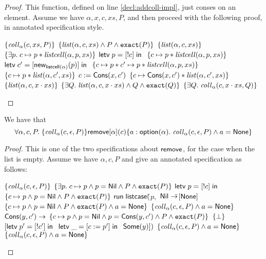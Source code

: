 \begin{proof}
  This function, defined on line \ref{decl:addcoll-impl}, just conses on an element. 
Assume we have $\alpha, x, c, xs, P$, and then proceed with the following proof, in
annotated specification style. 

\begin{specification}
\nextline $\{{\mathit{coll}_\alpha(c, xs, P)}\}$ 
\nextline $\{{\mathit{list}(\alpha, c, xs) \land P \land \mathtt{exact}({P})}\}$ 
\nextline $\{{\mathit{list}(\alpha, c, xs)}\}$ 
\nextline $\{{\exists p.\; c \mapsto p * \mathit{listcell}(\alpha, p, xs)}\}$ 
\nextline $\mathsf{letv}\;p = [!c]\;\mathsf{in}\;$ 
\nextline $\{{c \mapsto p * \mathit{listcell}(\alpha, p, xs)}\}$ 
\nextline $\mathsf{letv}\;c' = [\mathsf{new}_{\mathsf{listcell}(\alpha)}(p)]\;\mathsf{in}\;$
\nextline $\{{c \mapsto p * c' \mapsto p * \mathit{listcell}(\alpha, p, xs)}\}$ 
\nextline $\{{c \mapsto p * \mathit{list}(\alpha, c', xs)}\}$ 
\nextline $c := \mathsf{Cons}(x, c')$ 
\nextline $\{{c \mapsto \mathsf{Cons}(x, c') * \mathit{list}(\alpha, c', xs)}\}$ 
\nextline $\{{\mathit{list}(\alpha, c, x\cdot xs)}\}$ 
\nextline $\{{\exists Q.\; \mathit{list}(\alpha, c, x\cdot xs) \land Q \land \mathtt{exact}({Q})}\}$ 
\nextline $\{{\exists Q.\; \mathit{coll}_\alpha(c, x\cdot xs, Q)}\}$ 
\end{specification}
\end{proof}

\begin{lemma}
We have that 
\begin{displaymath}
  \forall \alpha, c, P.\; \{{\mathit{coll}_\alpha(c, \epsilon, P)}\}{\mathsf{remove}[\alpha](c)}\{{a:\mathsf{option }{(\alpha)}}.\;{\mathit{coll}_\alpha(c, \epsilon, P) \land a = \mathsf{None}}\}
\end{displaymath}
\end{lemma}

\begin{proof}
  This is one of the two specifications about $\mathsf{remove}$, for the case
  when the list is empty. Assume we have $\alpha, c, P$ and give an annotated
  specification as follows: 

\begin{specification}
\nextline $\{{\mathit{coll}_\alpha(c, \epsilon, P)}\}$ 
\nextline $\{{\exists p.\; c \mapsto p \land p = \mathsf{Nil} \land P \land \mathtt{exact}({P})}\}$ 
\nextline $\mathsf{letv}\;p = [!c]\;\mathsf{in}\;$ 
\nextline $\{{c \mapsto p \land p = \mathsf{Nil} \land P \land \mathtt{exact}({P})}\}$ 
\nextline $\mathsf{run}\;\mathsf{listcase}($\=$p,$ 
\nextline \> $\mathsf{Nil} \to $\=$[\mathsf{None}]$ 
\nextline \> \> $\{{c \mapsto p \land p = \mathsf{Nil} \land P \land \mathtt{exact}({P}) \land a = \mathsf{None}}\}$ 
\nextline \> \> $\{{\mathit{coll}_\alpha(c, \epsilon, P) \land a = \mathsf{None}}\}$ 
\nextline \> $\mathsf{Cons}(y, c') \to $ 
\nextline \> \> $\{{c \mapsto p \land p = \mathsf{Nil} \land p = \mathsf{Cons}(y, c') \land P \land \mathtt{exact}({P})}\}$ 
\nextline \> \> $\{{\bot}\}$ 
\nextline \> \> $[\mathsf{letv}\;p' = [!c']\;\mathsf{in}\;$ 
\nextline \> \> $\mathsf{letv}\;\_ = [c := p']\;\mathsf{in}\;$ 
\nextline \> \> $\mathsf{Some}(y)])$
\nextline \> \> $\{{\mathit{coll}_\alpha(c, \epsilon, P) \land a = \mathsf{None}}\}$ 
\nextline $\{{\mathit{coll}_\alpha(c, \epsilon, P) \land a = \mathsf{None}}\}$ 
\end{specification}
\end{proof}

